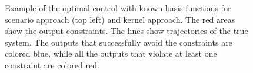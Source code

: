 \begin{figure}[htb]
{
 }
\caption{Example of the optimal control with known basis functions for scenario approach (top left) and kernel approach. The red areas show the output constraints. The lines show trajectories of the true system. The outputs that successfully avoid the constraints are colored blue, while all the outputs that violate at least one constraint are colored red.}

\label{ScenarioKernelComparisonCorridor}
\end{figure}
